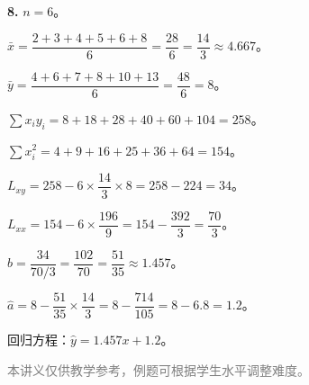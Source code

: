 \documentclass[12pt, a4paper]{ctexart}
\begin{document}
\begin{knowledgebox}[参考答案]
\medskip
\textbf{8.} $n=6$。

$\bar{x} = \dfrac{2+3+4+5+6+8}{6} = \dfrac{28}{6} = \dfrac{14}{3} \approx 4.667$。

$\bar{y} = \dfrac{4+6+7+8+10+13}{6} = \dfrac{48}{6} = 8$。

$\sum x_iy_i = 8+18+28+40+60+104 = 258$。

$\sum x_i^2 = 4+9+16+25+36+64 = 154$。

$L_{xy} = 258 - 6\times\dfrac{14}{3}\times8 = 258 - 224 = 34$。

$L_{xx} = 154 - 6\times\dfrac{196}{9} = 154 - \dfrac{392}{3} = \dfrac{70}{3}$。

$\hat{b} = \dfrac{34}{70/3} = \dfrac{102}{70} = \dfrac{51}{35} \approx 1.457$。

$\hat{a} = 8 - \dfrac{51}{35}\times\dfrac{14}{3} = 8 - \dfrac{714}{105} = 8 - 6.8 = 1.2$。

回归方程：$\boxed{\hat{y} = 1.457x + 1.2}$。
\end{knowledgebox}

\vfill
\begin{center}
\small\textcolor{gray}{本讲义仅供教学参考，例题可根据学生水平调整难度。}
\end{center}
\end{document}
